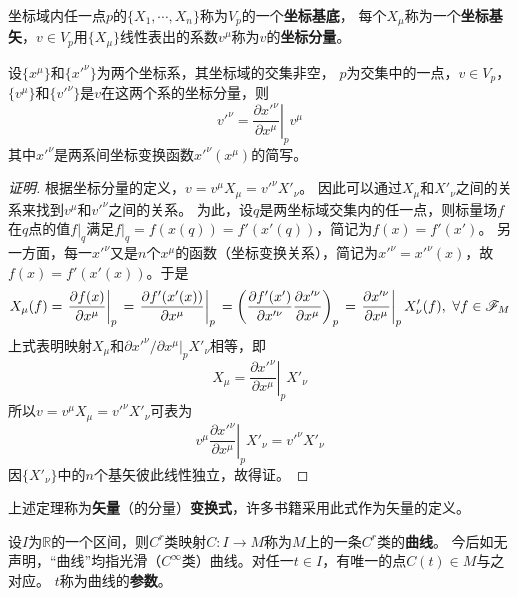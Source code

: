 \begin{definition}
坐标域内任一点$p$的$\{X_1, \cdots, X_n\}$称为$V_p$的一个\textbf{坐标基底}，
每个$X_\mu$称为一个\textbf{坐标基矢}，$v \in V_p$用$\{X_\mu\}$线性表出的系数$v^{\mu}$称为$v$的\textbf{坐标分量}。
\end{definition}

\begin{theorem}
设$\{x^\mu\}$和$\{x'^\nu\}$为两个坐标系，其坐标域的交集非空，
$p$为交集中的一点，$v \in V_p$，$\{v^\mu\}$和$\{v'^\nu\}$是$v$在这两个系的坐标分量，则
$$v'^\nu = \left.\frac{\partial x'^\nu}{\partial x^\mu}\right|_pv^\mu$$
其中$x'^\nu$是两系间坐标变换函数$x'^\nu(x^\mu)$的简写。
\end{theorem}

\begin{proof}[证明]
根据坐标分量的定义，$v = v^\mu X_\mu = v'^\nu X'_\nu$。
因此可以通过$X_\mu$和$X'_\nu$之间的关系来找到$v^\mu$和$v'^\nu$之间的关系。
为此，设$q$是两坐标域交集内的任一点，则标量场$f$在$q$点的值$f|_q$满足$f|_q = f(x(q)) = f'(x'(q))$，简记为$f(x) = f'(x')$。
另一方面，每一$x'^\nu$又是$n$个$x^\mu$的函数（坐标变换关系），简记为$x'^\nu = x'^\nu(x)$，故$f(x) = f'(x'(x))$。于是
$$
X_\mu(f) = \left.\frac{\partial f(x)}{\partial x^\mu}\right|_p \\
= \left.\frac{\partial f'(x'(x))}{\partial x^\mu}\right|_p \\
= \left(\frac{\partial f'(x')}{\partial x'^\nu}\frac{\partial x'^\nu}{\partial x^\mu}\right)_p \\
= \left.\frac{\partial x'^\nu}{\partial x^\mu}\right|_pX'_\nu(f), ~ \forall f \in \mathscr{F}_M
$$
上式表明映射$X_\mu$和$\partial x'^\nu/\partial x^\mu|_pX'_\nu$相等，即
$$X_\mu = \left.\frac{\partial x'^\nu}{\partial x^\mu}\right|_pX'_\nu$$
所以$v = v^\mu X_\mu = v'^\nu X'_\nu$可表为
$$v^\mu\left.\frac{\partial x'^\nu}{\partial x^\mu}\right|_pX'_\nu = v'^\nu X'_\nu$$
因$\{X'_\nu\}$中的$n$个基矢彼此线性独立，故得证。
\end{proof}

上述定理称为\textbf{矢量}（的分量）\textbf{变换式}，许多书籍采用此式作为矢量的定义。

\begin{definition}
设$I$为$\mathbb{R}$的一个区间，则$C^r$类映射$C \colon I \to M$称为$M$上的一条$C^r$类的\textbf{曲线}。
今后如无声明，``曲线''均指光滑（$C^\infty$类）曲线。对任一$t \in I$，有唯一的点$C(t) \in M$与之对应。
$t$称为曲线的\textbf{参数}。
\end{definition}

